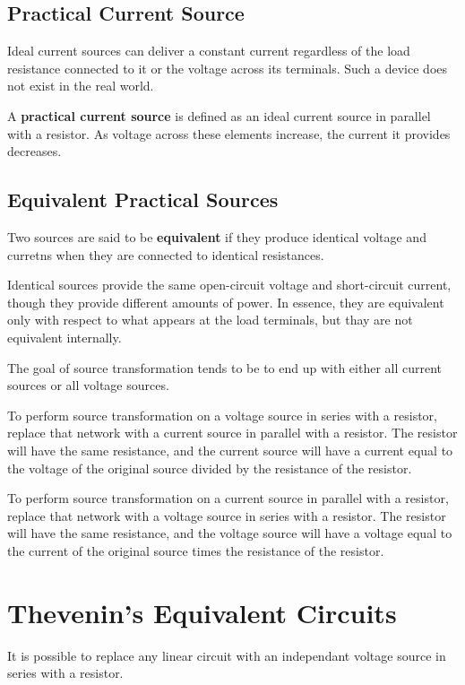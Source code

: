\documentclass[12pt]{article}
\begin{document}
\subsection*{Practical Current Source}
Ideal current sources can deliver a constant current regardless of the load resistance connected to it or the voltage across its terminals. Such a device does not exist in the real world.

A {\bf practical current source} is defined as an ideal current source in parallel with a resistor. As voltage across these elements increase, the current it provides decreases.

\subsection*{Equivalent Practical Sources}
Two sources are said to be {\bf equivalent} if they produce identical voltage and curretns when they are connected to identical resistances.

Identical sources provide the same open-circuit voltage and short-circuit current, though they provide different amounts of power. In essence, they are equivalent only with respect to what appears at the load terminals, but thay are not equivalent internally.

The goal of source transformation tends to be to end up with either all current sources or all voltage sources.

To perform source transformation on a voltage source in series with a resistor, replace that network with a current source in parallel with a resistor. The resistor will have the same resistance, and the current source will have a current equal to the voltage of the original source divided by the resistance of the resistor.

To perform source transformation on a current source in parallel with a resistor, replace that network with a voltage source in series with a resistor. The resistor will have the same resistance, and the voltage source will have a voltage equal to the current of the original source times the resistance of the resistor.

\section*{Thevenin's Equivalent Circuits}
\begin{theorem}
It is possible to replace any linear circuit with an independant voltage source in series with a resistor.
\end{theorem}
\end{document}

